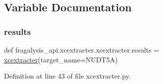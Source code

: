 \subsection{Variable Documentation}
\mbox{\label{namespacefragalysis__api_1_1xcextracter_1_1xcextracter_a72e0abb30ca031f003e991a2d76b1040}} 
\subsubsection{\texorpdfstring{results}{results}}
{\footnotesize\ttfamily def fragalysis\+\_\+api.\+xcextracter.\+xcextracter.\+results = \hyperlink{namespacefragalysis__api_1_1xcextracter_1_1xcextracter_a9aad6a3badcb479c966f153ce6b87126}{xcextracter}(target\+\_\+name=\textquotesingle{}N\+U\+D\+T5A\textquotesingle{})}



Definition at line 43 of file xcextracter.\+py.

